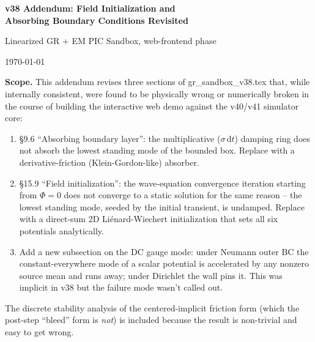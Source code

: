 \documentclass[11pt,a4paper]{article}
\newcommand{\dd}{\mathrm{d}}
\begin{document}

\begin{center}
  {\Large\bfseries\color{deepblue} v38 Addendum: Field Initialization and \\[2pt]
   Absorbing Boundary Conditions Revisited\par}
  \vspace{0.4cm}
  {\small Linearized GR + EM PIC Sandbox, web-frontend phase\par}
  \vspace{0.2cm}
  {\small \today\par}
\end{center}

\vspace{0.5cm}

\begin{shaded}
\textbf{Scope.}  This addendum revises three sections of
gr\_sandbox\_v38.tex that, while internally consistent, were found to
be physically wrong or numerically broken in the course of building
the interactive web demo against the v40/v41 simulator core:
\begin{enumerate}[leftmargin=*,nosep]
  \item \S 9.6 ``Absorbing boundary layer'': the multiplicative
    ($\sigma\,\dd t$) damping ring does not absorb the lowest standing
    mode of the bounded box.  Replace with a derivative-friction
    (Klein-Gordon-like) absorber.
  \item \S 15.9 ``Field initialization'': the wave-equation
    convergence iteration starting from $\Phi=0$ does not converge to
    a static solution for the same reason -- the lowest standing
    mode, seeded by the initial transient, is undamped.  Replace
    with a direct-sum 2D Li{\'e}nard-Wiechert initialization that
    sets all six potentials analytically.
  \item Add a new subsection on the DC gauge mode: under Neumann
    outer BC the constant-everywhere mode of a scalar potential is
    accelerated by any nonzero source mean and runs away; under
    Dirichlet the wall pins it.  This was implicit in v38 but the
    failure mode wasn't called out.
\end{enumerate}
The discrete stability analysis of the centered-implicit friction
form (which the post-step ``bleed'' form is \emph{not}) is included
because the result is non-trivial and easy to get wrong.
\end{shaded}
\end{document}
